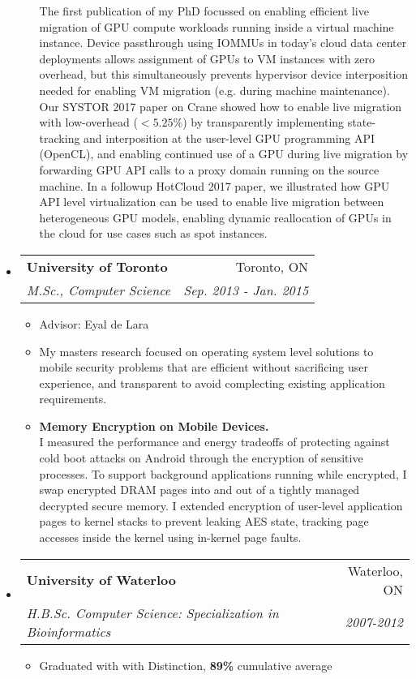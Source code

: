 \documentclass[letterpaper,11pt]{article}
\makeatletter
\newcommand{\company}[1]{
    \textbf{#1}
}
\newcommand{\resitem}[1]{\item #1 \vspace{-2pt}}
\newcommand{\ressubheading}[4]{
\begin{tabular*}{6.5in}{l@{\extracolsep{\fill}}r}
    
		\company{#1} & #2 \\
		\textit{#3} & \textit{#4} \\
\end{tabular*}\vspace{-6pt}}
\newcommand{\mscphdheading}[6]{
\begin{tabular*}{6.5in}{l@{\extracolsep{\fill}}r}
    
		\company{#1} & #2 \\
		\textit{#3} & \textit{#4} \\
		\textit{#5} & \textit{#6} \\
\end{tabular*}\vspace{-6pt}}
\makeatother
\begin{document}
\begin{itemize}
\begin{itemize}
{            The first publication of my PhD focussed on enabling efficient live migration of GPU compute workloads running 
            inside a virtual machine instance.  Device passthrough using IOMMUs in today's cloud data center deployments 
            allows assignment of GPUs to VM instances with zero overhead, but this simultaneously prevents hypervisor 
            device interposition needed for enabling VM migration (e.g. during machine maintenance).  Our SYSTOR 2017 
            paper on Crane showed how to enable live migration with low-overhead ($< 5.25\%$) by transparently 
            implementing state-tracking and interposition at the user-level GPU programming API (OpenCL), and enabling 
            continued use of a GPU during live migration by forwarding GPU API calls to a proxy domain running on the 
            source machine.  In a followup HotCloud 2017 paper, we illustrated how GPU API level virtualization can be 
            used to enable live migration between heterogeneous GPU models, enabling dynamic reallocation of GPUs in 
            the cloud for use cases such as spot instances.
        }
    \end{itemize}
\item
\ressubheading{University of Toronto}{Toronto, ON}{M.Sc., Computer Science}{Sep. 2013 - Jan. 2015}
	\begin{itemize}
		\resitem{Advisor: Eyal de Lara}
        \resitem{
            My masters research focused on operating system
            level solutions to mobile security problems that are efficient without 
            sacrificing user experience, and transparent to avoid complecting existing 
            application requirements.
        }
        \resitem{
            \textbf{Memory Encryption on Mobile Devices.} \\
            I measured the performance and energy tradeoffs of protecting against 
            cold boot attacks on Android through the encryption of sensitive processes.  To 
            support background applications running while encrypted, I swap encrypted DRAM 
            pages into and out of a tightly managed decrypted secure memory.
            I extended encryption of user-level application pages to kernel stacks 
            to prevent leaking AES state, tracking page accesses inside the kernel using 
            in-kernel page faults.
        }
	\end{itemize}

\item
	\ressubheading{University of Waterloo}{Waterloo, ON}{H.B.Sc. Computer Science: Specialization in Bioinformatics}{2007-2012}
	\begin{itemize}
		\resitem{Graduated with with Distinction, \textbf{89\%} cumulative average}
	\end{itemize}

\end{itemize}
\end{document}
